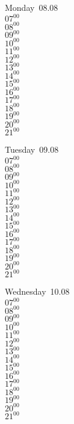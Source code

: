 \documentclass[11pt,a4paper]{book}\usepackage[]{graphicx}\usepackage[]{color}
\begin{document}
\begin{headerbox}
\end{headerbox}
\begin{weekdaybox}
  Monday~08.08\\
  { 
  \vfill
  $07^{00}$\\
$08^{00}$\\
$09^{00}$\\
$10^{00}$\\
$11^{00}$\\
$12^{00}$\\
$13^{00}$\\
$14^{00}$\\
$15^{00}$\\
$16^{00}$\\
$17^{00}$\\
$18^{00}$\\
$19^{00}$\\
$20^{00}$\\
$21^{00}$\\
  }
\end{weekdaybox}
\begin{weekdaybox}
  Tuesday~09.08\\
  { 
  \vfill
  $07^{00}$\\
$08^{00}$\\
$09^{00}$\\
$10^{00}$\\
$11^{00}$\\
$12^{00}$\\
$13^{00}$\\
$14^{00}$\\
$15^{00}$\\
$16^{00}$\\
$17^{00}$\\
$18^{00}$\\
$19^{00}$\\
$20^{00}$\\
$21^{00}$\\
  }
\end{weekdaybox}
\begin{weekdaybox}
  Wednesday~10.08\\
  { 
  \vfill
  $07^{00}$\\
$08^{00}$\\
$09^{00}$\\
$10^{00}$\\
$11^{00}$\\
$12^{00}$\\
$13^{00}$\\
$14^{00}$\\
$15^{00}$\\
$16^{00}$\\
$17^{00}$\\
$18^{00}$\\
$19^{00}$\\
$20^{00}$\\
$21^{00}$\\
  }
\end{weekdaybox}
\end{document}

